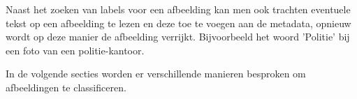 Naast het zoeken van labels voor een afbeelding kan men ook trachten eventuele tekst op een afbeelding te lezen en deze toe te voegen aan de metadata, opnieuw wordt op deze manier de afbeelding verrijkt. Bijvoorbeeld het woord 'Politie' bij een foto van een politie-kantoor.

In de volgende secties worden er verschillende manieren besproken om afbeeldingen te classificeren.


\subsection{}
\label{sec:manuele-classificatie}
%

